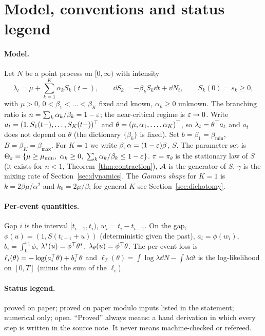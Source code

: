 \section{Model, conventions and status legend}\label{sec:model}

\paragraph{Model.}
Let $N$ be a point process on $[0,\infty)$ with intensity
\[
\lambda_t=\mu+\sum_{k=1}^K\alpha_kS_k(t-),\qquad
\dd S_k=-\beta_kS_k\dd t+\dd N_t,\qquad S_k(0)=s_k\ge0,
\]
with $\mu>0$, $0<\beta_1<\dots<\beta_K$ fixed and known, $\alpha_k\ge0$ unknown.
The branching ratio is $n=\sum_k\alpha_k/\beta_k=1-\varepsilon$; the near-critical regime is $\varepsilon\to0$.
Write $a_t=(1,S_1(t-),\dots,S_K(t-))^{\top}$ and $\theta=(\mu,\alpha_1,\dots,\alpha_K)^{\top}$, so $\lambda_t=\theta^{\top} a_t$
and $a_t$ does not depend on $\theta$ (the dictionary $\{\beta_k\}$ is fixed).
Set $b=\beta_1=\beta_{\min}$, $B=\beta_K=\beta_{\max}$.
For $K=1$ we write $\beta,\alpha=(1-\varepsilon)\beta$, $S$.
The parameter set is $\Theta_\eps=\{\mu\ge\mu_{\min},\ \alpha_k\ge0,\ \sum_k\alpha_k/\beta_k\le1-\eps\}$.
$\pi=\pi_\theta$ is the stationary law of $S$ (it exists for $n<1$, Theorem~\ref{thm:contraction}),
$\mathcal A$ is the generator of $S$, $\gamma$ is the mixing rate of Section~\ref{sec:dynamics}.
The \emph{Gamma shape} for $K=1$ is $k=2\beta\mu/\alpha^2$ and $k_0=2\mu/\beta$; for general $K$ see
Section~\ref{sec:dichotomy}.

\paragraph{Per-event quantities.}
Gap $i$ is the interval $[t_{i-1},t_i)$, $w_i=t_i-t_{i-1}$.
On the gap, $\phi(u)=(1,S(t_{i-1}+u))$ (deterministic given the past), $a_i=\phi(w_i)$, $b_i=\int_0^{w_i}\phi$,
$\lambda^*(u)=\phi^{\top}\theta^*$, $\lambda_\theta(u)=\phi^{\top}\theta$.
The per-event loss is $\ell_i(\theta)=-\log(a_i^{\top}\theta)+b_i^{\top}\theta$ and $\ell_T(\theta)=\int\log\lambda\dd N-\int\lambda\dd t$
is the log-likelihood on $[0,T]$ (minus the sum of the $\ell_i$).

\paragraph{Status legend.}
\Pt{} proved on paper; \Ps{} proved on paper modulo inputs listed in the statement; \Nt{} numerical only; \Ot{} open.
``Proved'' always means: a hand derivation in which every step is written in the source note.
It never means machine-checked or refereed.

